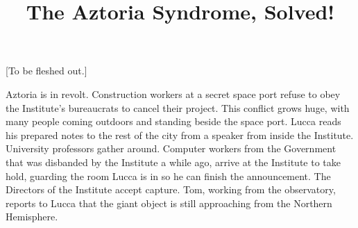 \documentclass[11pt]{article}
\begin{document}
\ttfamily
\title{The Aztoria Syndrome, Solved!}
\maketitle

[To be fleshed out.]

Aztoria is in revolt. 
Construction workers at a secret space port refuse to obey the Institute's bureaucrats to cancel their project.
This conflict grows huge, with many people coming outdoors and standing beside the space port.
Lucca reads his prepared notes to the rest of the city from a speaker from inside the Institute.
University professors gather around.
Computer workers from the Government that was disbanded by the Institute a while ago, arrive at the Institute to take hold, guarding the room Lucca is in so he can finish the announcement.
The Directors of the Institute accept capture.
Tom, working from the observatory, reports to Lucca that the giant object is still approaching from the Northern Hemisphere. 

\
\end{document}
